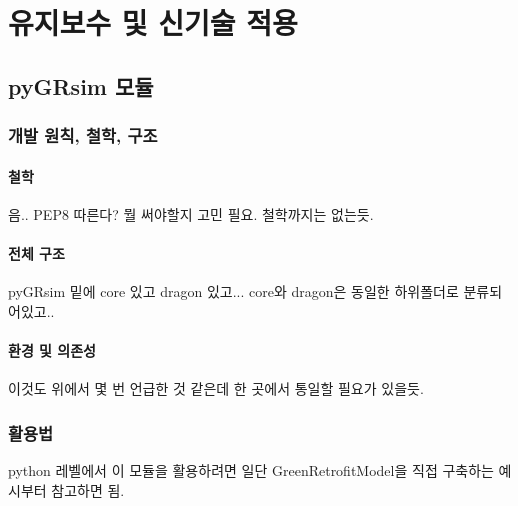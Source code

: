 \part{유지보수 및 신기술 적용}
\label{part:module}


\chapter{pyGRsim 모듈}

\section{개발 원칙, 철학, 구조}

\subsection{철학}
음.. PEP8 따른다? 뭘 써야할지 고민 필요. 철학까지는 없는듯.

\subsection{전체 구조}
pyGRsim 밑에 core 있고 dragon 있고... core와 dragon은 동일한 하위폴더로 분류되어있고..

\subsection{환경 및 의존성}
이것도 위에서 몇 번 언급한 것 같은데 한 곳에서 통일할 필요가 있을듯.



\section{활용법}
python 레벨에서 이 모듈을 활용하려면 일단 GreenRetrofitModel을 직접 구축하는 예시부터 참고하면 됨.


